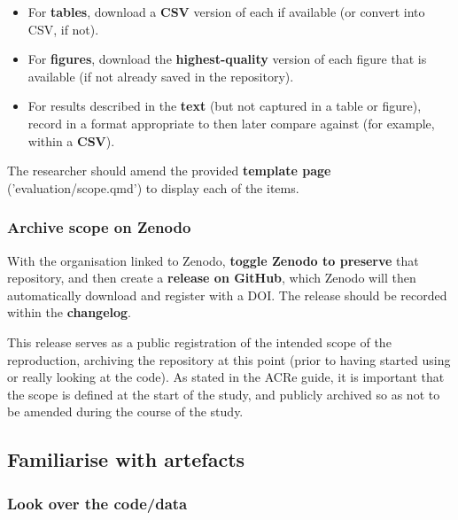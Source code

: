\begin{itemize}
    \item For \textbf{tables}, download a \textbf{CSV} version of each if available (or convert into CSV, if not).
    \item For \textbf{figures}, download the \textbf{highest-quality} version of each figure that is available (if not already saved in the repository).
    \item For results described in the \textbf{text} (but not captured in a table or figure), record in a format appropriate to then later compare against (for example, within a \textbf{CSV}).
\end{itemize}

The researcher should amend the provided \textbf{template page} ('evaluation/scope.qmd') to display each of the items.

\vspace{0.5cm}
\subsubsection{Archive scope on Zenodo}

With the organisation linked to Zenodo, \textbf{toggle Zenodo to preserve} that repository, and then create a \textbf{release on GitHub}, which Zenodo will then automatically download and register with a DOI. The release should be recorded within the \textbf{changelog}.

This release serves as a public registration of the intended scope of the reproduction, archiving the repository at this point (prior to having started using or really looking at the code). As stated in the ACRe guide,\autocite{berkeley_initiative_for_transparency_in_the_social_sciences_guide_2022} it is important that the scope is defined at the start of the study, and publicly archived so as not to be amended during the course of the study.\autocite{berkeley_initiative_for_transparency_in_the_social_sciences_guide_2022}

\vspace{0.5cm}
\subsection{Familiarise with artefacts}

\subsubsection{Look over the code/data}

